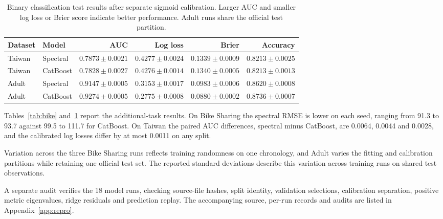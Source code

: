 \begin{table}[htbp]\centering\small

\caption{Binary classification test results after separate sigmoid calibration. Larger AUC and smaller log loss or Brier score indicate better performance. Adult runs share the official test partition.}\label{tab:classification}

\begin{tabular}{llrrrr}\toprule Dataset & Model & AUC & Log loss & Brier & Accuracy\\\midrule

Taiwan & Spectral & $0.7873\pm0.0021$ & $0.4277\pm0.0024$ & $0.1339\pm0.0009$ & $0.8213\pm0.0025$\\

Taiwan & CatBoost & $0.7828\pm0.0027$ & $0.4276\pm0.0014$ & $0.1340\pm0.0005$ & $0.8213\pm0.0013$\\

Adult & Spectral & $0.9147\pm0.0005$ & $0.3153\pm0.0017$ & $0.0983\pm0.0006$ & $0.8620\pm0.0008$\\

Adult & CatBoost & $0.9274\pm0.0005$ & $0.2775\pm0.0008$ & $0.0880\pm0.0002$ & $0.8736\pm0.0007$\\

\bottomrule\end{tabular}\end{table}

Tables~\ref{tab:bike} and~\ref{tab:classification} report the additional-task results. On Bike Sharing the spectral RMSE is lower on each seed, ranging from 91.3 to 93.7 against 99.5 to 111.7 for CatBoost. On Taiwan the paired AUC differences, spectral minus CatBoost, are 0.0064, 0.0044 and 0.0028, and the calibrated log losses differ by at most 0.0011 on any split.

Variation across the three Bike Sharing runs reflects training randomness on one chronology, and Adult varies the fitting and calibration partitions while retaining one official test set. The reported standard deviations describe this variation across training runs on shared test observations.

A separate audit verifies the 18 model runs, checking source-file hashes, split identity, validation selections, calibration separation, positive metric eigenvalues, ridge residuals and prediction replay. The accompanying source, per-run records and audits are listed in Appendix~\ref{app:repro}.
